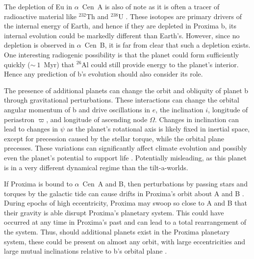 \documentclass[preprint,12pt]{aastex}
\newcommand{\xxx}[1]{{\color{red} #1}} %
\def\eg{{\it e.g.\ }}
\def\acen{{$\alpha$~Cen}}
\begin{document}
The depletion of Eu in \acen~A is also of note as it is often a tracer
of radioactive material like $^{232}$Th and $^{238}$U
\citep{Young14}. These isotopes are primary drivers of the internal
energy of Earth, and hence if they are depleted in Proxima b, its
internal evolution could be markedly different than Earth's. However,
since no depletion is observed in \acen~B, it is far from clear that
such a depletion exists. One interesting radiogenic possibility is
that the planet could form sufficiently quickly ($\sim~1$~Myr) that
$^{26}$Al could still provide energy to the planet's interior. Hence any
prediction of b's evolution should also consider its role.

The presence of additional planets can change the orbit and obliquity
of planet b through gravitational perturbations. These interactions
can change the orbital angular momentum of b and drive oscillations in
$e$, the inclination $i$, longitude of periastron $\varpi$, and
longitude of ascending node $\Omega$. Changes in inclination can lead
to changes in $\psi$ as the planet's rotational axis is likely fixed
in inertial space, except for precession caused by the stellar torque,
while the orbital plane precesses. These variations can significantly
affect climate evolution and possibly even the planet's potential to
support life \citep{Armstrong14}. \xxx{Potentially misleading, as this planet
is in a very different dynamical regime than the tilt-a-worlds.}

If Proxima is bound to \acen~A and B, then perturbations by passing
stars and torques by the galactic tide can cause drifts in Proxima's
orbit about A and B \citep{Kaib13}. During epochs of high
eccentricity, Proxima may swoop so close to A and B that their gravity
is able disrupt Proxima's planetary system. This could have occurred
at any time in Proxima's past and can lead to a total rearrangement of
the system. Thus, should additional planets exist in the Proxima
planetary system, these could be present on almost any orbit, with large
eccentricities and large mutual inclinations relative to b's orbital plane \citep[\eg][]{Barnes11}.
\end{document}
